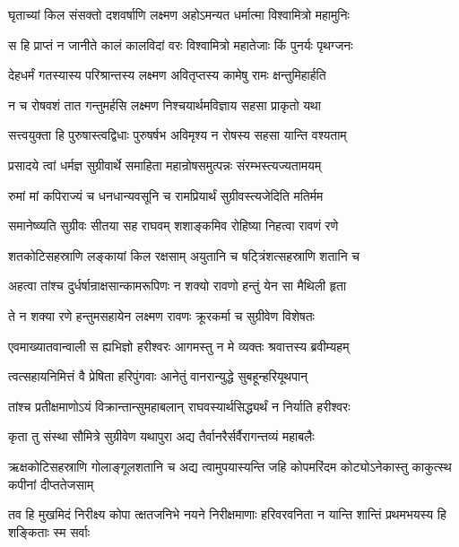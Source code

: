 \twolineshloka
{घृताच्यां किल संसक्तो दशवर्षाणि लक्ष्मण}
{अहोऽमन्यत धर्मात्मा विश्वामित्रो महामुनिः} %

\twolineshloka
{स हि प्राप्तं न जानीते कालं कालविदां वरः}
{विश्वामित्रो महातेजाः किं पुनर्यः पृथग्जनः} %

\twolineshloka
{देहधर्मं गतस्यास्य परिश्रान्तस्य लक्ष्मण}
{अवितृप्तस्य कामेषु रामः क्षन्तुमिहार्हति} %

\twolineshloka
{न च रोषवशं तात गन्तुमर्हसि लक्ष्मण}
{निश्चयार्थमविज्ञाय सहसा प्राकृतो यथा} %

\twolineshloka
{सत्त्वयुक्ता हि पुरुषास्त्वद्विधाः पुरुषर्षभ}
{अविमृश्य न रोषस्य सहसा यान्ति वश्यताम्} %

\twolineshloka
{प्रसादये त्वां धर्मज्ञ सुग्रीवार्थे समाहिता}
{महान्रोषसमुत्पन्नः संरम्भस्त्यज्यतामयम्} %

\twolineshloka
{रुमां मां कपिराज्यं च धनधान्यवसूनि च}
{रामप्रियार्थं सुग्रीवस्त्यजेदिति मतिर्मम} %

\twolineshloka
{समानेष्व्यति सुग्रीवः सीतया सह राघवम्}
{शशाङ्कमिव रोहिष्या निहत्वा रावणं रणे} %

\twolineshloka
{शतकोटिसहस्राणि लङ्कायां किल रक्षसाम्}
{अयुतानि च षट्त्रिंशत्सहस्राणि शतानि च} %

\twolineshloka
{अहत्वा तांश्च दुर्धर्षान्राक्षसान्कामरूपिणः}
{न शक्यो रावणो हन्तुं येन सा मैथिली हृता} %

\twolineshloka
{ते न शक्या रणे हन्तुमसहायेन लक्ष्मण}
{रावणः क्रूरकर्मा च सुग्रीवेण विशेषतः} %

\twolineshloka
{एवमाख्यातवान्वाली स ह्यभिज्ञो हरीश्वरः}
{आगमस्तु न मे व्यक्तः श्रवात्तस्य ब्रवीम्यहम्} %

\twolineshloka
{त्वत्सहायनिमित्तं वै प्रेषिता हरिपुंगवाः}
{आनेतुं वानरान्युद्धे सुबहून्हरियूथपान्} %

\twolineshloka
{तांश्च प्रतीक्षमाणोऽयं विक्रान्तान्सुमहाबलान्}
{राघवस्यार्थसिद्ध्यर्थं न निर्याति हरीश्वरः} %

\twolineshloka
{कृता तु संस्था सौमित्रे सुग्रीवेण यथापुरा}
{अद्य तैर्वानरैर्सर्वैरागन्तव्यं महाबलैः} %

\threelineshloka
{ऋक्षकोटिसहस्राणि गोलाङ्गूलशतानि च}
{अद्य त्वामुपयास्यन्ति जहि कोपमरिंदम}
{कोट्योऽनेकास्तु काकुत्स्थ कपीनां दीप्ततेजसाम्} %

\fourlineindentedshloka
{तव हि मुखमिदं निरीक्ष्य कोपा}
{त्क्षतजनिभे नयने निरीक्षमाणाः}
{हरिवरवनिता न यान्ति शान्तिं}
{ प्रथमभयस्य हि शङ्किताः स्म सर्वाः} %


